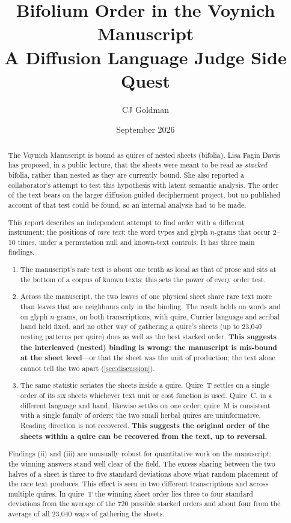 \documentclass[11pt,a4paper]{article}
\title{\sffamily\bfseries\LARGE Bifolium Order in the Voynich Manuscript\\[2pt]
\Large A Diffusion Language Judge Side Quest}
\author{\sffamily CJ Goldman}
\date{\sffamily 3 September 2026}
\begin{document}
\maketitle

\begin{abstract}
The Voynich Manuscript is bound as quires of nested sheets (bifolia). Lisa Fagin Davis has proposed, in a public lecture, that the sheets were meant to be read as \emph{stacked} bifolia, rather than nested as they are currently bound. She also reported a collaborator's attempt to test this hypothesis with latent semantic analysis. The order of the text bears on the larger diffusion-guided decipherment project, but no published account of that test could be found, so an internal analysis had to be made.

This report describes an independent attempt to find order with a different instrument: the positions of \emph{rare text}: the word types and glyph $n$-grams that occur 2--10 times, under a permutation null and known-text controls. It has three main findings.
\begin{enumerate}[leftmargin=2.2em,itemsep=0.35ex,topsep=0.6ex,label=(\roman*)]
\item The manuscript's rare text is about one tenth as local as that of prose and sits at the bottom of a corpus of known texts; this sets the power of every order test.
\item Across the manuscript, the two leaves of one physical sheet share rare text more than leaves that are neighbours only in the binding. The result holds on words and on glyph $n$-grams, on both transcriptions, with quire, Currier language and scribal hand held fixed, and no other way of gathering a quire's sheets (up to 23,040 nesting patterns per quire) does as well as the best stacked order. \textbf{This suggests the interleaved (nested) binding is wrong: the manuscript is mis-bound at the sheet level}---or that the sheet was the unit of production; the text alone cannot tell the two apart (\cref{sec:discussion}).
\item The same statistic seriates the sheets inside a quire. Quire~T settles on a single order of its six sheets whichever text unit or cost function is used. Quire~C, in a different language and hand, likewise settles on one order; quire~M is consistent with a single family of orders; the two small herbal quires are uninformative. Reading direction is not recovered. \textbf{This suggests the original order of the sheets within a quire can be recovered from the text, up to reversal.}
\end{enumerate}

Findings (ii) and (iii) are unusually robust for quantitative work on the manuscript: the winning answers stand well clear of the field. The excess sharing between the two halves of a sheet is three to five standard deviations above what random placement of the rare text produces. This effect is seen in two different transcriptions and across multiple quires. In quire~T the winning sheet order lies three to four standard deviations from the average of the 720 possible stacked orders and about four from the average of all 23,040 ways of gathering the sheets.

\end{abstract}
\end{document}
